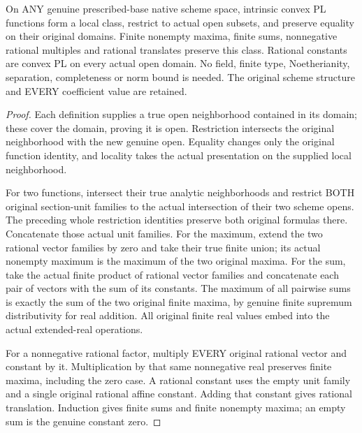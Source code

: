 \begin{theorem}
\label{scheme:actual-native-convex-pl-closure}
\leanok
{}
On ANY genuine prescribed-base native scheme space, intrinsic convex PL
functions form a local class, restrict to actual open subsets, and preserve
equality on their original domains. Finite nonempty maxima, finite sums,
nonnegative rational multiples and rational translates preserve this class.
Rational constants are convex PL on every actual open domain.
No field, finite type, Noetherianity, separation, completeness or norm bound
is needed. The original scheme structure and EVERY coefficient value are
retained.
\end{theorem}
\begin{proof}
Each definition supplies a true open neighborhood contained in its domain;
these cover the domain, proving it is open. Restriction intersects the original
neighborhood with the new genuine open. Equality changes only the original
function identity, and locality takes the actual presentation on the supplied
local neighborhood.

For two functions, intersect their true analytic neighborhoods and restrict
BOTH original section-unit families to the actual intersection of their two
scheme opens. The preceding whole restriction identities preserve both
original formulas there. Concatenate those actual unit families. For the
maximum, extend the two rational vector families by zero and take their true
finite union; its actual nonempty maximum is the maximum of the two original
maxima. For the sum, take the actual finite product of rational vector families
and concatenate each pair of vectors with the sum of its constants. The
maximum of all pairwise sums is exactly the sum of the two original finite
maxima, by genuine finite supremum distributivity for real addition. All
original finite real values embed into the actual extended-real operations.

For a nonnegative rational factor, multiply EVERY original rational vector
and constant by it. Multiplication by that same nonnegative real preserves
finite maxima, including the zero case. A rational constant uses the empty
unit family and a single original rational affine constant. Adding that
constant gives rational translation. Induction gives finite sums and finite
nonempty maxima; an empty sum is the genuine constant zero.
\end{proof}
